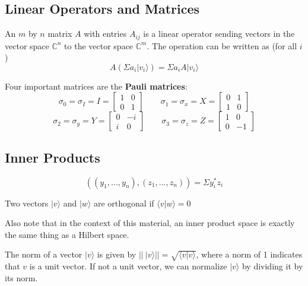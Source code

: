 \documentclass[12pt]{article}
\theoremstyle{mytheor}
\begin{document}
\subsection{Linear Operators and Matrices}

An $m$ by $n$ matrix $A$ with entries $A_{ij}$ is a linear operator sending vectors in the vector space $\mathbb{C}^n$  to the vector space $\mathbb{C}^m$. The operation can be written as (for all $i$) $$A\left(\Sigma a_i|v_i\rangle\right) = \Sigma a_iA|v_i\rangle$$

Four important matrices are the \textbf{Pauli matrices}:
  $$\sigma_0=\sigma_I=I=
  \begin{bmatrix}
    1 & 0\\
    0 & 1
  \end{bmatrix}\qquad
  \sigma_1=\sigma_x=X=
  \begin{bmatrix}
    0 & 1\\
    1 & 0
  \end{bmatrix}$$
  $$\sigma_2=\sigma_y=Y=
  \begin{bmatrix}
    0 & -i\\
    i & 0
  \end{bmatrix}\qquad
  \sigma_3=\sigma_z=Z=
  \begin{bmatrix}
    1 & 0\\
    0 & -1
  \end{bmatrix}$$
  
\subsection{Inner Products}

$$((y_1,...,y_n),(z_1,...,z_n)) = \Sigma y_i^*z_i$$

Two vectors $|v\rangle$ and $|w\rangle$ are orthogonal if $\langle v|w\rangle=0$

Also note that in the context of this material, an inner product space is exactly the same thing as a Hilbert space.

The norm of a vector $|v\rangle$ is given by $||\ |v\rangle|| = \sqrt{\langle v|v\rangle}$, where a norm of 1 indicates that $v$ is a unit vector. If not a unit vector, we can normalize $|v\rangle$ by dividing it by its norm.
\end{document}
